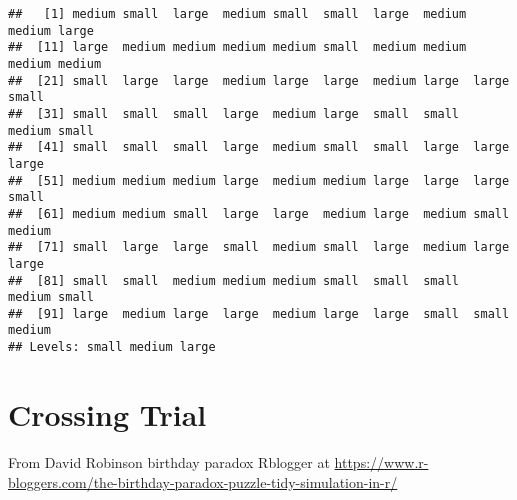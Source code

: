 \documentclass[]{book}
\newenvironment{Shaded}{\begin{snugshade}}{\end{snugshade}}
\newcommand{\DataTypeTok}[1]{\textcolor[rgb]{0.13,0.29,0.53}{#1}}
\newcommand{\DecValTok}[1]{\textcolor[rgb]{0.00,0.00,0.81}{#1}}
\newcommand{\KeywordTok}[1]{\textcolor[rgb]{0.13,0.29,0.53}{\textbf{#1}}}
\newcommand{\NormalTok}[1]{#1}
\newcommand{\OperatorTok}[1]{\textcolor[rgb]{0.81,0.36,0.00}{\textbf{#1}}}
\newcommand{\OtherTok}[1]{\textcolor[rgb]{0.56,0.35,0.01}{#1}}
\newcommand{\StringTok}[1]{\textcolor[rgb]{0.31,0.60,0.02}{#1}}
\begin{document}
\begin{verbatim}
##   [1] medium small  large  medium small  small  large  medium medium large 
##  [11] large  medium medium medium medium small  medium medium medium medium
##  [21] small  large  large  medium large  large  medium large  large  small 
##  [31] small  small  small  large  medium large  small  small  medium small 
##  [41] small  small  small  large  medium small  small  large  large  large 
##  [51] medium medium medium large  medium medium large  large  large  small 
##  [61] medium medium small  large  large  medium large  medium small  medium
##  [71] small  large  large  small  medium small  large  medium large  large 
##  [81] small  small  medium medium medium small  small  small  medium small 
##  [91] large  medium large  large  medium large  large  small  small  medium
## Levels: small medium large
\end{verbatim}

\hypertarget{crossing-trial}{%
\chapter{Crossing Trial}\label{crossing-trial}}

From David Robinson birthday paradox Rblogger at \url{https://www.r-bloggers.com/the-birthday-paradox-puzzle-tidy-simulation-in-r/}

\begin{Shaded}
\end{Shaded}
\end{document}
